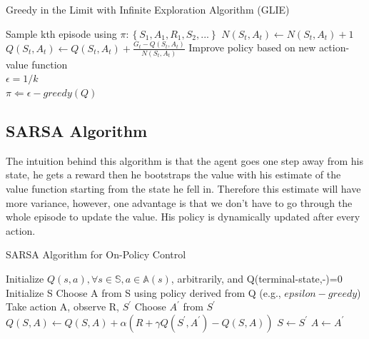 \documentclass[12pt,a4paper]{article}
\begin{document}
\begin{algorithm}
\caption{Greedy in the Limit with Infinite Exploration Algorithm (GLIE)}
\label{alg:glie}
\begin{algorithmic}[1]
\State Sample kth episode using $\pi: \left\{S_{1}, A_{1}, R_{1}, S_{2}, ...\right\}$
\State $N(S_{t}, A_{t}) \leftarrow N(S_{t}, A_{t}) + 1$
\State $Q(S_{t}, A_{t}) \leftarrow Q(S_{t}, A_{t}) + \frac{G_{t} - Q(S_{t}, A_{t})}{N(S_{t}, A_{t})}$
\EndFor
\State Improve policy based on new action-value function
\\ $\epsilon = 1/k $
\\ $\pi \Leftarrow \epsilon-greedy(Q) $
\end{algorithmic}
\end{algorithm}


\subsection{SARSA Algorithm}


The intuition behind this algorithm is that the agent goes one step away from his state, he gets a reward then he bootstraps the value with his estimate of the value function starting from the state he fell in. Therefore this estimate will have more variance, however, one advantage is that we don't have to go through the whole episode to update the value. His policy is dynamically updated after every action.


\begin{algorithm}
\caption{SARSA Algorithm for On-Policy Control}
\label{alg:sarsa}
\begin{algorithmic}[1]
\State Initialize $Q(s,a),\forall s \in \mathbb{S}, a \in \mathbb{A}(s)$, arbitrarily, and Q(terminal-state,-)=0
\State Initialize S
\State Choose A from S using policy derived from Q (e.g., $epsilon-greedy$)
\State Take action A, observe R, $S^{\prime}$
\State Choose $A^{\prime}$ from $S^{\prime}$
\State $Q(S,A) \leftarrow Q(S,A) + \alpha(R + \gamma Q(S^{\prime}, A^{\prime}) - Q(S, A))$
\State $S \leftarrow S^{\prime}$
\State $A \leftarrow A^{\prime}$
\EndFor
\EndFor
\end{algorithmic}
\end{algorithm}
\end{document}
